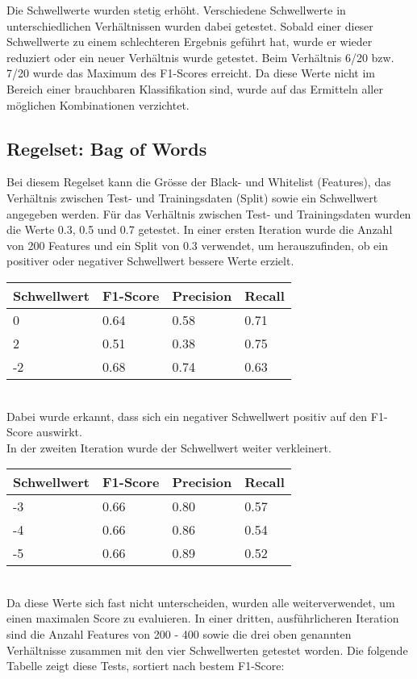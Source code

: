 Die Schwellwerte wurden stetig erhöht.
Verschiedene Schwellwerte in unterschiedlichen Verhältnissen wurden dabei getestet.
Sobald einer dieser Schwellwerte zu einem schlechteren Ergebnis geführt hat, wurde er wieder reduziert oder ein neuer Verhältnis wurde getestet.
Beim Verhältnis 6/20 bzw. 7/20 wurde das Maximum des F1-Scores erreicht.
Da diese Werte nicht im Bereich einer brauchbaren Klassifikation sind, wurde auf das Ermitteln aller möglichen Kombinationen verzichtet.
\subsection{Regelset: Bag of Words}
Bei diesem Regelset kann die Grösse der Black- und Whitelist (Features), das Verhältnis zwischen Test- und Trainingsdaten (Split) sowie ein Schwellwert angegeben werden.
Für das Verhältnis zwischen Test- und Trainingsdaten wurden die Werte 0.3, 0.5 und 0.7 getestet.
In einer ersten Iteration wurde die Anzahl von 200 Features und ein Split von 0.3 verwendet, um herauszufinden, ob ein positiver oder negativer Schwellwert bessere Werte erzielt.\\
\begin{tabular}{|l|l|l|l|}
	\hline
	Schwellwert & F1-Score & Precision & Recall\\
	\hline
	0 & 0.64 & 0.58 & 0.71 \\
	2 & 0.51 & 0.38 & 0.75 \\
	-2 & 0.68 & 0.74 & 0.63 \\
	\hline
\end{tabular}\\
Dabei wurde erkannt, dass sich ein negativer Schwellwert positiv auf den F1-Score auswirkt.\\
In der zweiten Iteration wurde der Schwellwert weiter verkleinert.\\
\begin{tabular}{|l|l|l|l|}
	\hline
	Schwellwert & F1-Score & Precision & Recall\\
	\hline
	-3 & 0.66 & 0.80 & 0.57 \\
	-4 & 0.66 & 0.86 & 0.54 \\
	-5 & 0.66 & 0.89 & 0.52 \\
	\hline
\end{tabular}\\ 
Da diese Werte sich fast nicht unterscheiden, wurden alle weiterverwendet, um einen maximalen Score zu evaluieren.
In einer dritten, ausführlicheren Iteration sind die Anzahl Features von 200 - 400 sowie die drei oben genannten Verhältnisse zusammen mit den vier Schwellwerten getestet worden. Die folgende Tabelle zeigt diese Tests, sortiert nach bestem F1-Score:\\
